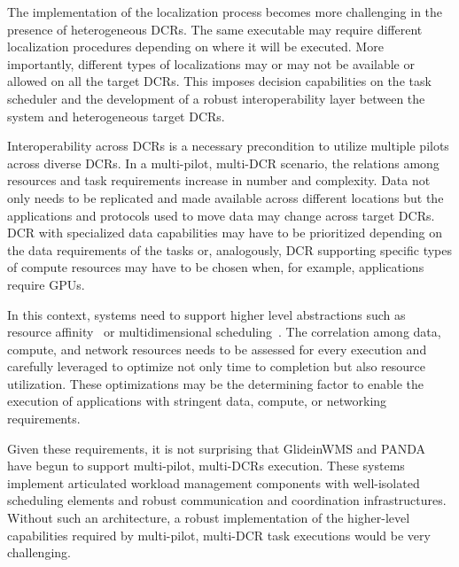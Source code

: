 \documentclass{sig-alternate}
\begin{document}
The implementation of the localization process becomes more challenging in the
presence of heterogeneous DCRs. The same executable may require different
localization procedures depending on where it will be executed. More
importantly, different types of localizations may or may not be available or
allowed on all the target DCRs. This imposes decision capabilities on the task
scheduler and the development of a robust interoperability layer between the
\pilot system and heterogeneous target DCRs. 


Interoperability across DCRs is a necessary precondition to utilize multiple
pilots across diverse DCRs. In a multi-pilot, multi-DCR scenario, the relations
among resources and task requirements increase in number and complexity. Data
not only needs to be replicated and made available across different locations
but the applications and protocols used to move data may change across target
DCRs. DCR with specialized data capabilities may have to be prioritized
depending on the data requirements of the tasks or, analogously, DCR supporting
specific types of compute resources may have to be chosen when, for example,
applications require GPUs.

In this context, \pilot systems need to support higher level abstractions such
as resource affinity~\cite{luckow2014pilot,neumeyer2010s4} or multidimensional
scheduling~\cite{zhu2008multi}. The correlation among data, compute, and network
resources needs to be assessed for every execution and carefully leveraged to
optimize not only time to completion but also resource utilization. These
optimizations may be the determining factor to enable the execution of
applications with stringent data, compute, or networking requirements.


Given these requirements, it is not surprising that GlideinWMS and PANDA have
begun to support multi-pilot, multi-DCRs execution. These \pilot systems
implement articulated workload management components with well-isolated
scheduling elements and robust communication and coordination infrastructures.
Without such an architecture, a robust implementation of the higher-level
capabilities required by multi-pilot, multi-DCR task executions would be very
challenging.
\end{document}
